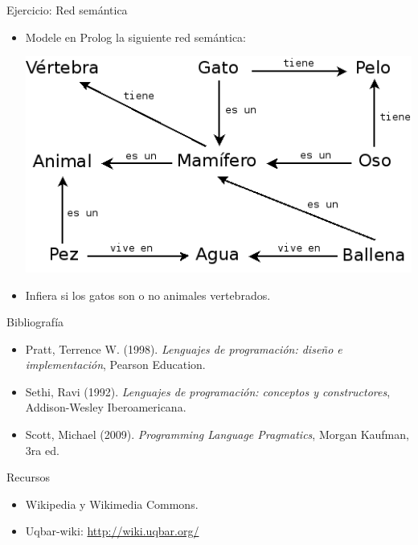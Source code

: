 \documentclass[handout]{beamer} %
\newcommand{\green}[1]{{\color{green!70!black}{#1}}}
\begin{document}
\begin{frame}{Ejercicio: Red semántica}
    \begin{itemize}
        \item Modele en Prolog la siguiente red semántica:
        
        \begin{center}
          \includegraphics[width=.7\textwidth]{./image/cap8/red-semantica.png}
        \end{center}
        \item Infiera si los gatos son o no animales vertebrados.
    \end{itemize}
    \begin{flushright}
        \green{[+1 bonus]}
    \end{flushright}
\end{frame}





\begin{frame}
 \begin{block}{Bibliografía}
  \begin{itemize}
    \item Pratt, Terrence W. (1998). \textit{Lenguajes de programación: diseño e implementación}, Pearson Education.
    \item Sethi, Ravi (1992). \textit{Lenguajes de programación: conceptos y constructores}, Addison-Wesley Iberoamericana.
    \item Scott, Michael (2009). \textit{Programming Language Pragmatics}, Morgan Kaufman, 3ra ed.
  \end{itemize}
 \end{block}
 \begin{block}{Recursos}
  \begin{itemize}
    \item Wikipedia y Wikimedia Commons.
    \item Uqbar-wiki: \url{http://wiki.uqbar.org/}
  \end{itemize}
 \end{block}
\end{frame}
\end{document}
